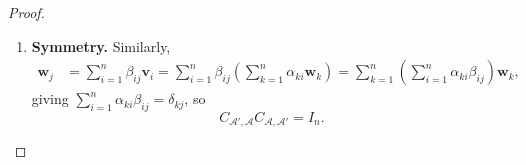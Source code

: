 \begin{proof}
\begin{enumerate}
    \begin{align*}
    \mathbf{v}_j 
    &= \sum_{i=1}^n \alpha_{ij} \mathbf{w}_i 
    = \sum_{i=1}^n \alpha_{ij} \left( \sum_{k=1}^n \beta_{ki} \mathbf{v}_k \right) 
    = \sum_{i=1}^n \sum_{k=1}^n \alpha_{ij} \beta_{ki} \mathbf{v}_k \\
    &= \sum_{k=1}^n \left( \sum_{i=1}^n \beta_{ki} \alpha_{ij} \right) \mathbf{v}_k.
    \end{align*}
    
    By the uniqueness of coordinates, we imply
    \[
    \left( \sum_{i=1}^n \beta_{ki} \alpha_{ij} \right) = \delta_{jk} := 
    \begin{cases}
    1, & j = k \\
    0, & j \ne k
    \end{cases}
    \]
    
    By matrix multiplication, the \( (k,j) \)-th entry of \( C_{\mathcal{A},\mathcal{A}'} C_{\mathcal{A}',\mathcal{A}} \) is
    \[
    [C_{\mathcal{A},\mathcal{A}'} C_{\mathcal{A}',\mathcal{A}}]_{kj} = \left( \sum_{i=1}^n \beta_{ki} \alpha_{ij} \right) = \delta_{jk}
    \Rightarrow C_{\mathcal{A},\mathcal{A}'} C_{\mathcal{A}',\mathcal{A}} = I_n.
    \]

  \item \textbf{Symmetry.} Similarly,
  \begin{align*}
    \mathbf{w}_j &= \sum_{i=1}^n \beta_{ij} \mathbf{v}_i 
    = \sum_{i=1}^n \beta_{ij} \left( \sum_{k=1}^n \alpha_{ki} \mathbf{w}_k \right) 
    = \sum_{k=1}^n \left( \sum_{i=1}^n \alpha_{ki} \beta_{ij} \right) \mathbf{w}_k,
  \end{align*}
  giving \( \sum_{i=1}^n \alpha_{ki} \beta_{ij} = \delta_{kj} \), so
  \[
  C_{\mathcal{A}',\mathcal{A}} C_{\mathcal{A},\mathcal{A}'} = I_n.
  \]
\end{enumerate}
\end{proof}

